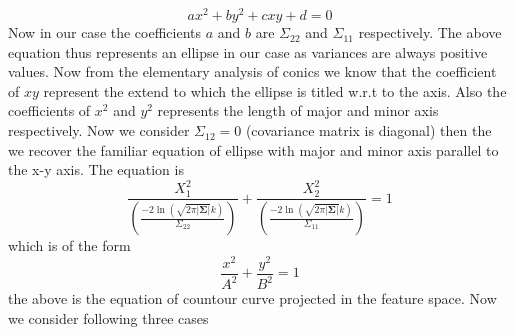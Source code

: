 \documentclass[a4paper]{article}
\begin{document}
\begin{equation}
ax^{2}+by^{2}+cxy+d=0
\end{equation}Now in our case the coefficients $a$ and $b$ are $\Sigma_{22}$ and $\Sigma_{11}$ respectively. The above equation thus represents an ellipse in our case as variances are always positive values. Now from the elementary analysis of conics we know that the coefficient of $xy$ represent the extend to which the ellipse is titled w.r.t to the axis. Also the coefficients of $x^{2}$ and $y^{2}$ represents the length of major and minor axis respectively. Now we consider $\Sigma_{12}=0$ (covariance matrix is diagonal) then the we recover the familiar equation of ellipse with major and minor axis parallel to the x-y axis. The equation is
\begin{equation}
\frac{X_{1}^{2}}{\left(\frac{-2\ln(\sqrt{2\pi\left|\mathbf{\Sigma}\right|}k)}{\Sigma_{22}}\right)}+\frac{X_{2}^{2}}{\left(\frac{-2\ln(\sqrt{2\pi\left|\mathbf{\Sigma}\right|}k)}{\Sigma_{11}}\right)}=1
\end{equation}which is of the form
\[
\frac{x^{2}}{A^{2}}+\frac{y^{2}}{B^{2}}=1
\]the above is the equation of countour curve projected in the feature space. Now we consider following three cases


\end{document}
